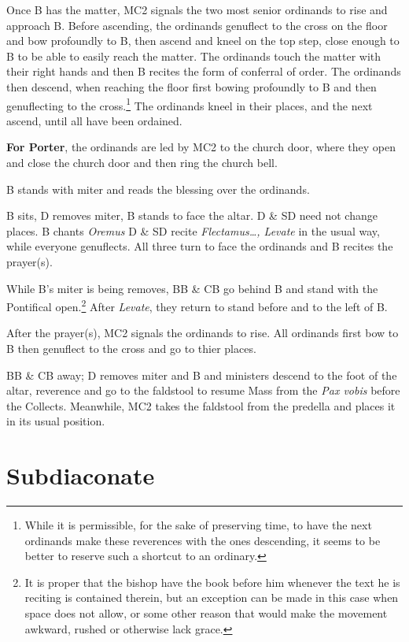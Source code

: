 \documentclass[letterpaper]{report}
\begin{document}
{    \rubric Once B has the matter, MC2 signals the two most senior ordinands to
    rise and approach B. Before ascending, the ordinands genuflect to the cross
    on the floor and bow profoundly to B, then ascend and kneel on the top
    step, close enough to B to be able to easily reach the matter. The
    ordinands touch the matter with their right hands and then B recites the
    form of conferral of order. The ordinands then descend, when reaching the
    floor first bowing profoundly to B and then genuflecting to the
    cross.\footnote{While it is permissible, for the sake of preserving time,
    to have the next ordinands make these reverences with the ones descending,
it seems to be better to reserve such a shortcut to an ordinary.} The ordinands
kneel in their places, and the next ascend, until all have been ordained.

    \rubric \textbf{For Porter}, the ordinands are led by MC2 to the church
    door, where they open and close the church door and then ring the church
    bell.

    \rubric B stands with miter and reads the blessing over the ordinands.

    \rubric B sits, D removes miter, B stands to face the altar. D \& SD need
    not change places. B chants \textit{Oremus} D \& SD recite
    \textit{Flectamus\dots, Levate} in the usual way, while everyone
    genuflects. All three turn to face the ordinands and B recites the prayer(s).

    \rubric While B's miter is being removes, BB \& CB go behind B and stand
    with the Pontifical open.\footnote{It is proper that the bishop have the
        book before him whenever the text he is reciting is contained therein,
        but an exception can be made in this case when space does not allow, or
    some other reason that would make the movement awkward, rushed or otherwise
lack grace.} After \textit{Levate}, they return to stand before and to the left
of B.

    \rubric After the prayer(s), MC2 signals the ordinands to rise. All
    ordinands first bow to B then genuflect to the cross and go to thier
    places.

    \rubric BB \& CB away; D removes miter and B and ministers descend to the
    foot of the altar, reverence and go to the faldstool to resume Mass from
    the \textit{Pax vobis} before the Collects. Meanwhile, MC2 takes the
    faldstool from the predella and places it in its usual position.


    \section{Subdiaconate}

}
\end{document}
